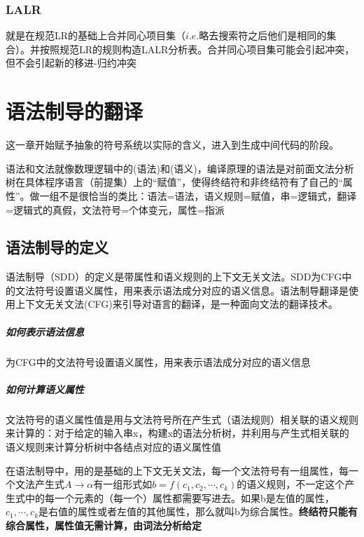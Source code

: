 \documentclass[]{report}
\begin{document}
		\subsection{LALR}
		就是在规范LR的基础上合并同心项目集（$i.e.$略去搜索符之后他们是相同的集合）。并按照规范LR的规则构造LALR分析表。合并同心项目集可能会引起冲突，但不会引起新的移进-归约冲突

	\chapter{语法制导的翻译}
	这一章开始赋予抽象的符号系统以实际的含义，进入到生成中间代码的阶段。\par
	语法和文法就像数理逻辑中的(语法)和(语义)，编译原理的语法是对前面文法分析树在具体程序语言（前提集）上的“赋值”，使得终结符和非终结符有了自己的“属性”。做一组不是很恰当的类比：语法=语法，语义规则=赋值，串=逻辑式，翻译=逻辑式的真假，文法符号=个体变元，属性=指派
	\section{语法制导的定义}
	语法制导（SDD）的定义是带属性和语义规则的上下文无关文法。SDD为CFG中的文法符号设置语义属性，用来表示语法成分对应的语义信息。语法制导翻译是使用上下文无关文法(CFG)来引导对语言的翻译，是一种面向文法的翻译技术。
	\paragraph{如何表示语法信息} 为CFG中的文法符号设置语义属性，用来表示语法成分对应的语义信息
	\paragraph{如何计算语义属性} 文法符号的语义属性值是用与文法符号所在产生式（语法规则）相关联的语义规则来计算的：对于给定的输入串x，构建x的语法分析树，并利用与产生式相关联的语义规则来计算分析树中各结点对应的语义属性值\par
	在语法制导中，用的是基础的上下文无关文法，每一个文法符号有一组属性，每一个文法产生式$A\to\alpha$有一组形式如$b=f(c_1,c_2,\cdots,c_k)$的语义规则，不一定这个产生式中的每一个元素的（每一个）属性都需要写进去。如果b是左值的属性，$c_1,\cdots,c_k$是右值的属性或者左值的其他属性，那么就叫b为综合属性。\textbf{终结符只能有综合属性，属性值无需计算，由词法分析给定}
\end{document}
